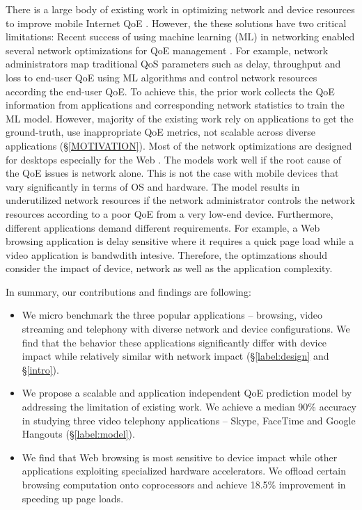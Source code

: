 There is a large body of existing work in optimizing network and device resources to improve mobile Internet QoE \cite{jana2016qoe}. However, the these solutions have two critical limitations: Recent success of using machine learning (ML) in networking enabled several network optimizations for QoE management \cite{jana2016qoe}. For example, network administrators map traditional QoS parameters such as delay, throughput and loss to end-user QoE using ML algorithms and control network resources according the end-user QoE. To achieve this, the prior work collects the QoE information from applications and corresponding network statistics to train the ML model. However, majority of the existing work rely on applications to get the ground-truth, use inappropriate QoE metrics, not scalable across diverse applications (\S\ref{MOTIVATION}).
Most of the network optimizations are designed for desktops especially for the Web \cite{nejati2016depth}. 
The models work well if the root cause of the QoE issues is network alone. This is not the case with mobile devices that vary significantly in terms of OS and hardware.
The model results in underutilized network resources if the network administrator controls the network resources according to a poor QoE from a very low-end device. 
Furthermore, different applications demand different requirements. For example, a Web browsing application is delay sensitive where it requires a quick page load while a video application is bandwdith intesive.
Therefore, the optimzations should consider the impact of device, network as well as the application complexity.

In summary, our contributions and findings are following:

\begin{itemize}
\item We micro benchmark the three popular applications -- browsing, video streaming and telephony with diverse network and device configurations. We find that the behavior these applications significantly differ with device impact while relatively similar with network impact (\S \ref{label:design} and \S \ref{intro}).
\item We propose a scalable and application independent QoE prediction model by addressing the limitation of existing work. We achieve a median 90\% accuracy in studying three video telephony applications -- Skype, FaceTime and Google Hangouts (\S \ref{label:model}).
\item We find that Web browsing is most sensitive to device impact while other applications exploiting specialized hardware accelerators. We offload certain browsing computation onto coprocessors and achieve 18.5\% improvement in speeding up page loads.
\end{itemize}
